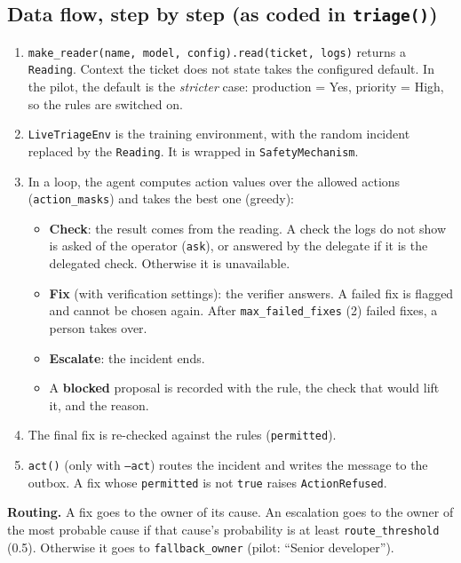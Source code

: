 \documentclass[11pt,a4paper]{article}
\begin{document}
\subsection{Data flow, step by step (as coded in \texttt{triage()})}

\begin{enumerate}
\item \texttt{make\_reader(name, model, config).read(ticket, logs)} returns a \texttt{Reading}.
  Context the ticket does not state takes the configured default. In the pilot, the default is
  the \emph{stricter} case: production = Yes, priority = High, so the rules are switched on.
\item \texttt{LiveTriageEnv} is the training environment, with the random incident replaced by
  the \texttt{Reading}. It is wrapped in \texttt{SafetyMechanism}.
\item In a loop, the agent computes action values over the allowed actions
  (\texttt{action\_masks}) and takes the best one (greedy):
  \begin{itemize}
  \item \textbf{Check}: the result comes from the reading. A check the logs do not show is asked
    of the operator (\texttt{ask}), or answered by the delegate if it is the delegated check.
    Otherwise it is unavailable.
  \item \textbf{Fix} (with verification settings): the verifier answers. A failed fix is flagged
    and cannot be chosen again. After \texttt{max\_failed\_fixes} (2) failed fixes, a person
    takes over.
  \item \textbf{Escalate}: the incident ends.
  \item A \textbf{blocked} proposal is recorded with the rule, the check that would lift it, and
    the reason.
  \end{itemize}
\item The final fix is re-checked against the rules (\texttt{permitted}).
\item \texttt{act()} (only with \texttt{--act}) routes the incident and writes the message to the
  outbox. A fix whose \texttt{permitted} is not \texttt{true} raises \texttt{ActionRefused}.
\end{enumerate}

\textbf{Routing.} A fix goes to the owner of its cause. An escalation goes to the owner of the
most probable cause if that cause's probability is at least \texttt{route\_threshold} (0.5).
Otherwise it goes to \texttt{fallback\_owner} (pilot: ``Senior developer'').
\end{document}
